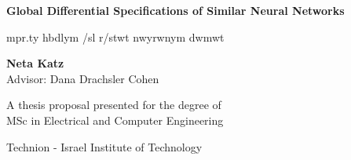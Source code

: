 
\begin{titlepage}
   \begin{center}

       \huge
       \textbf{Global Differential Specifications of Similar Neural Networks}

       \vspace*{1cm}


       \begin{cjhebrew}mpr.ty hbdlym /sl r/stwt nwyrwnym dwmwt\end{cjhebrew}






%

       \vspace{2.5cm}

        \Large
        \textbf{Neta Katz} \\
        
        Advisor: Dana Drachsler Cohen\\


       \vfill

       A thesis proposal presented for the degree of\\
       MSc in Electrical and Computer Engineering

       \vspace{0.8cm}


       Technion - Israel Institute of Technology\\

   \end{center}
\end{titlepage} 